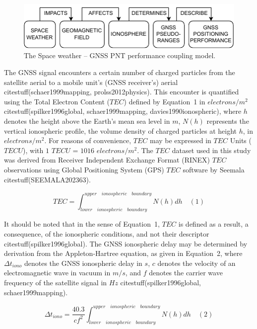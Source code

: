 \let\LaTeXcline\cline\documentclass[sn-mathphys-num]{sn-jnl}\let\cline\LaTeXcline
\begin{document}
\begin{figure}[!ht]
 \centering
 \includegraphics[width=0.89\linewidth]{SpaceWeather-TwoLines.drawio.pdf}
    \caption{The Space weather – GNSS PNT performance coupling model.}
    \label{fig:SpaceWeather}
\end{figure}

The GNSS signal encounters a certain number of charged particles from the satellite aerial to a mobile unit’s (GNSS receiver’s) aerial citestuff(schaer1999mapping, prolss2012physics). This encounter is quantified using the Total Electron Content ($TEC$) defined by Equation~1 in $electrons/m^{2}$ citestuff(spilker1996global, schaer1999mapping, davies1990ionospheric), where $h$ denotes the height above the Earth’s mean sea level in $m$, $N(h)$ represents the vertical ionospheric profile, the volume density of charged particles at height $h$, in $electrons/m^{2}$. For reasons of convenience, $TEC$ may be expressed in $TEC$ Units ($TECU$), with $1$ $TECU$ = $1016$ $electrons/m^{2}$. The $TEC$ dataset used in this study was derived from Receiver Independent Exchange Format (RINEX) $TEC$ observations using Global Positioning System (GPS) $TEC$ software by Seemala citestuff(SEEMALA202363).

\begin{equation}
	TEC = \int_{lower \quad ionospheric \quad boundary}^{upper \quad ionospheric \quad boundary}N(h)dh
	\quad\left(1\right)
\end{equation}

It should be noted that in the sense of Equation~1, $TEC$ is defined as a result, a consequence, of the ionospheric conditions, and not their descriptor citestuff(spilker1996global). The GNSS ionospheric delay may be determined by derivation from the Appleton-Hartree equation, as given in Equation~2, where $\Delta t_{iono}$ denotes the GNSS ionospheric delay in $s$, $c$ denotes the velocity of an electromagnetic wave in vacuum in $m/s$, and $f$ denotes the carrier wave frequency of the satellite signal in $Hz$ citestuff(spilker1996global, schaer1999mapping).

\begin{equation}
	\Delta t_{iono} = \frac{40.3}{c f^{2}} \int_{lower \quad ionospheric \quad boundary}^{upper \quad ionospheric \quad boundary}N(h)dh
	\quad\left(2\right)
\end{equation}
\end{document}
